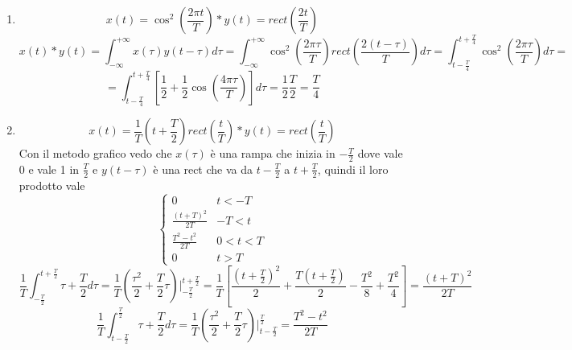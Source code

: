 \documentclass{article}
\begin{document}
\begin{enumerate}
    \item \LARGE\[x(t)=\cos^2\left(\frac{2\pi t}{T}\right)*y(t)=rect\left(\frac{2 t}{T}\right)\]\normalsize
    \[x(t)*y(t)=\int_{-\infty}^{+\infty}x(\tau)y(t-\tau)d\tau=\int_{-\infty}^{+\infty}\cos^2\left(\frac{2\pi\tau}{T}\right)rect\left(\frac{2(t-\tau)}{T}\right)d\tau=\int_{t-\frac{T}{4}}^{t+\frac{T}{4}}\cos^2\left(\frac{2\pi\tau}{T}\right)d\tau=\]
    \[=\int_{t-\frac{T}{4}}^{t+\frac{T}{4}}\left[\frac{1}{2}+\frac{1}{2}\cos\left(\frac{4\pi\tau}{T}\right)\right]d\tau=\frac{1}{2}\frac{T}{2}=\frac{T}{4}\]
    \item \LARGE\[x(t)=\frac{1}{T}\left(t+\frac{T}{2}\right)rect\left(\frac{t}{T}\right)*y(t)=rect\left(\frac{t}{T}\right)\]\normalsize
    Con il metodo grafico vedo che $x(\tau)$ è una rampa che inizia in $-\frac{T}{2}$ dove vale 0 e vale 1 in $\frac{T}{2}$ e $y(t-\tau)$ è una rect che va da $t-\frac{T}{2}$ a $t+\frac{T}{2}$, quindi il loro prodotto vale
    \[\begin{cases}
        0&t<-T\\
        \frac{{(t+T)}^2}{2T}&-T<t\\
        \frac{T^2-t^2}{2T}&0<t<T\\
        0&t>T
    \end{cases}\]
    \[\frac{1}{T}\int_{-\frac{T}{2}}^{t+\frac{T}{2}}\tau+\frac{T}{2}d\tau=\frac{1}{T}\left(\frac{\tau^2}{2}+\frac{T}{2}\tau\right)\Big|_{-\frac{T}{2}}^{t+\frac{T}{2}}=\frac{1}{T}\left[\frac{{\left(t+\frac{T}{2}\right)}^2}{2}+\frac{T\left(t+\frac{T}{2}\right)}{2}-\frac{T^2}{8}+\frac{T^2}{4}\right]=\frac{{(t+T)}^2}{2T}\]
    \[\frac{1}{T}\int_{t-\frac{T}{2}}^{\frac{T}{2}}\tau+\frac{T}{2}d\tau=\frac{1}{T}\left(\frac{\tau^2}{2}+\frac{T}{2}\tau\right)\Big|_{t-\frac{T}{2}}^{\frac{T}{2}}=\frac{T^2-t^2}{2T}\]
\end{enumerate}
\end{document}
